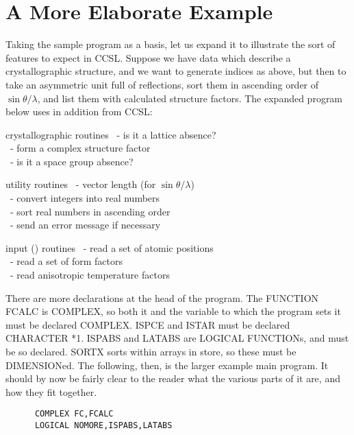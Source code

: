 {\section{A More Elaborate Example}
% 
Taking the sample program as a basis, let us expand it to illustrate the
sort of features to expect in CCSL.  Suppose we have data which describe
a crystallographic structure, and we want to generate indices as above,
but then to take an asymmetric unit full of reflections, sort them in
ascending order of $\sin\theta/\lambda$, and list them with calculated
structure factors.
\pn
The expanded program below uses in addition from CCSL:\p
\begin{list} {} {\setlength{\labelwidth}{60mm}
  \setlength{\parsep}{-1ex}
  \setlength{\leftmargin}{\labelwidth}} 
\item[crystallographic routines \hfill] 
\ - is it a lattice absence?\\
\  - form a complex structure factor\\
\ - is it a space group absence?
\item[utility routines \hfill] 
\ - vector length (for $\sin\theta/\lambda$)\\
\ - convert integers into real numbers\\
\  - sort real numbers in ascending order\\
\ - send an error message if necessary
\item[input (\ital{setting-up}) routines \hfill] 
\ - read a set of atomic positions\\
\ - read a set of form factors\\
\ - read anisotropic temperature factors\end{list}
There are more declarations at the head of the program.  The FUNCTION
FCALC is COMPLEX, so both it and the variable to which the program sets
it must be declared COMPLEX.  ISPCE and ISTAR must be declared
CHARACTER *1.
\pn 
ISPABS and LATABS are LOGICAL FUNCTIONs, and must be so declared.
SORTX sorts within arrays in store, so these must be DIMENSIONed. 
\goodbreak \pn
The following, then, is the larger example main program.  It should
by now be fairly clear to the reader what the various parts of it are,
and how they fit together.
\p
\ttfamily\begin{verbatim}
      COMPLEX FC,FCALC
      LOGICAL NOMORE,ISPABS,LATABS

\end{verbatim}}
